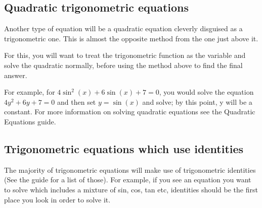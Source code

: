 \documentclass[
  12pt,
  a4paper, oneside]{starmastarticle}
\begin{document}
\hypertarget{quadratic-trigonometric-equations}{%
\subsection*{Quadratic trigonometric
equations}\label{quadratic-trigonometric-equations}}

Another type of equation will be a quadratic equation cleverly disguised
as a trigonometric one. This is almost the opposite method from the one
just above it.

For this, you will want to treat the trigonometric function as the
variable and solve the quadratic normally, before using the method above
to find the final answer.

For example, for \(4\sin^{2}(x)+6\sin(x)+7=0\), you would solve the
equation \(4y^2+6y+7=0\) and then set \(y=\sin(x)\) and solve; by this
point, y will be a constant. For more information on solving quadratic
equations see the Quadratic Equations guide.

\hypertarget{trigonometric-equations-which-use-identities}{%
\subsection*{Trigonometric equations which use
identities}\label{trigonometric-equations-which-use-identities}}

The majority of trigonometric equations will make use of trigonometric
identities (See the guide for a list of those). For example, if you see
an equation you want to solve which includes a mixture of sin, cos, tan
etc, identities should be the first place you look in order to solve it.
\end{document}
